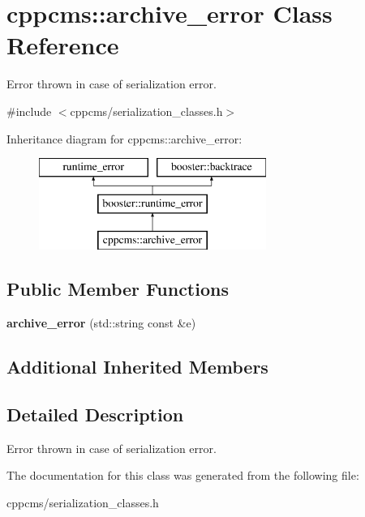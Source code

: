 \section{cppcms\+:\+:archive\+\_\+error Class Reference}
\label{classcppcms_1_1archive__error}


Error thrown in case of serialization error.  




{\ttfamily \#include $<$cppcms/serialization\+\_\+classes.\+h$>$}

Inheritance diagram for cppcms\+:\+:archive\+\_\+error\+:\begin{figure}[H]
\begin{center}
\leavevmode
\includegraphics[height=3.000000cm]{classcppcms_1_1archive__error}
\end{center}
\end{figure}
\subsection*{Public Member Functions}
\begin{DoxyCompactItemize}
\item 
{\bfseries archive\+\_\+error} (std\+::string const \&e)\label{classcppcms_1_1archive__error_abe2df913b4c009ffb5fce90f0b81702e}

\end{DoxyCompactItemize}
\subsection*{Additional Inherited Members}


\subsection{Detailed Description}
Error thrown in case of serialization error. 

The documentation for this class was generated from the following file\+:\begin{DoxyCompactItemize}
\item 
cppcms/serialization\+\_\+classes.\+h\end{DoxyCompactItemize}
